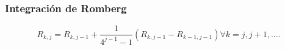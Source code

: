 \begin{frame}
    \frametitle{Integración de Romberg}

    \begin{equation*}
        R_{k,j}=
        R_{k,j-1}+
        \dfrac{1}{4^{j-1}-1}
        \left(R_{k,j-1}-R_{k-1,j-1}\right)
        \forall k=j,j+1,\dotsc.
    \end{equation*}
\end{frame}